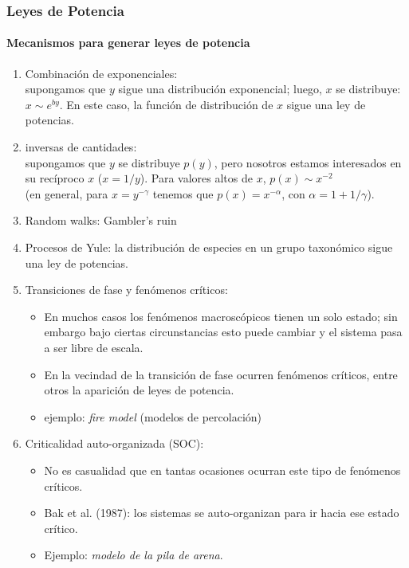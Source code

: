 \documentclass[11pt]{beamer}
\begin{document}
\begin{frame}[allowframebreaks]
\frametitle{Leyes de Potencia}
\framesubtitle{Mecanismos para generar leyes de potencia}
\begin{enumerate}
    \item Combinación de exponenciales:\\
    supongamos que $y$ sigue una distribución exponencial; luego, $x$ se distribuye: $x\sim e^{by}$. En este caso, la función de distribución de $x$
sigue una ley de potencias.
\item inversas de cantidades:\\
supongamos que $y$ se distribuye $p(y)$, pero nosotros estamos interesados en su recíproco $x$ ($x=1/y$). Para valores altos de $x$, $p(x)\sim x^{-2}$ \\(en general, para $x=y^{-\gamma}$ tenemos que $p(x)=x^{-\alpha}$, con $\alpha=1+1/\gamma$).
\item Random walks: Gambler’s ruin
\item Procesos de Yule: la distribución de especies en un grupo taxonómico sigue una ley de potencias.
\item Transiciones de fase y fenómenos críticos:\\
\begin{itemize}
    \item En muchos casos los fenómenos macroscópicos tienen un solo estado; sin embargo bajo ciertas circunstancias esto puede cambiar y el sistema pasa a ser libre de escala.
    \item En la vecindad de la transición de fase ocurren fenómenos críticos, entre otros la aparición de leyes de potencia.
    \item ejemplo: \textit{fire model} (modelos de percolación)
\end{itemize} 
\item Criticalidad auto-organizada (SOC):\\
\begin{itemize}
    \item No es casualidad que en tantas ocasiones ocurran este tipo de fenómenos críticos.
    \item Bak et al. (1987): los sistemas se auto-organizan para ir hacia ese estado crítico.
    \item Ejemplo: \textit{modelo de la pila de arena}.
\end{itemize}
\end{enumerate}

\end{frame}
\end{document}
